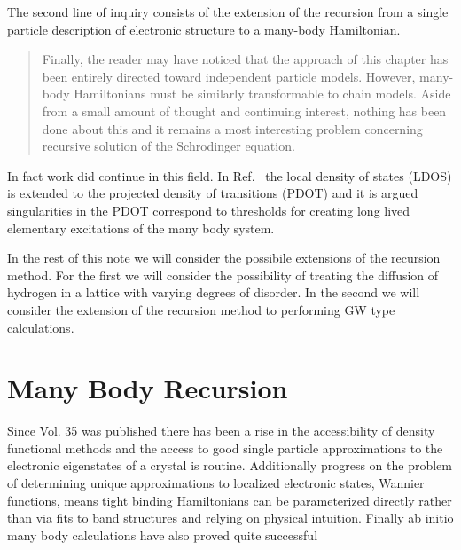 The second line of inquiry consists of the extension of the recursion from a single 
particle description of electronic structure to a many-body Hamiltonian.
%
\begin{quote}
Finally, the reader may have noticed that the approach of this chapter has been entirely directed
toward independent particle models. However, many-body Hamiltonians must be similarly 
transformable to chain models. Aside from a small amount of thought and continuing interest, 
nothing has been done about this and it remains a most interesting problem concerning recursive 
solution of the Schrodinger equation.
\end{quote}

In fact work did continue in this field. In Ref.~\cite{annett94} the local density of states (LDOS)
is extended to the projected density of transitions (PDOT) and it is argued singularities
in the PDOT correspond to thresholds for creating long lived elementary excitations 
of the many body system.

In the rest of this note we will consider the possibile extensions of the recursion method.
For the first we will consider the possibility of treating the diffusion of hydrogen 
in a lattice with varying degrees of disorder. In the second we will consider the extension
of the recursion method to performing GW type calculations.


\section{Many Body Recursion}
\label{sec:manybodyrecursion}
	Since Vol. 35 was published there has been a rise in the accessibility of density functional methods 
and the access to good single particle approximations to the electronic eigenstates of a crystal
is routine. Additionally progress on the problem of determining unique approximations to localized
electronic states, Wannier functions, means tight binding Hamiltonians can be parameterized directly
rather than via fits to band structures and relying on physical intuition. Finally ab initio many body
calculations have also proved quite successful

